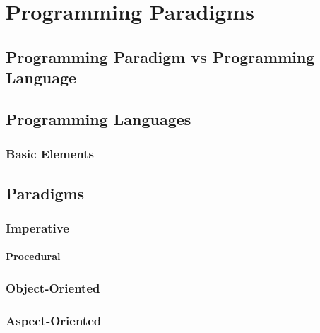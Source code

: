 \chapter{Programming Paradigms}
\label{ch:paradigms}


\section{Programming Paradigm vs Programming Language}


\section{Programming Languages}


\subsection{Basic Elements}


\section{Paradigms}


\subsection{Imperative}


\subsubsection{Procedural}


\subsection{Object-Oriented}


\subsection{Aspect-Oriented}


